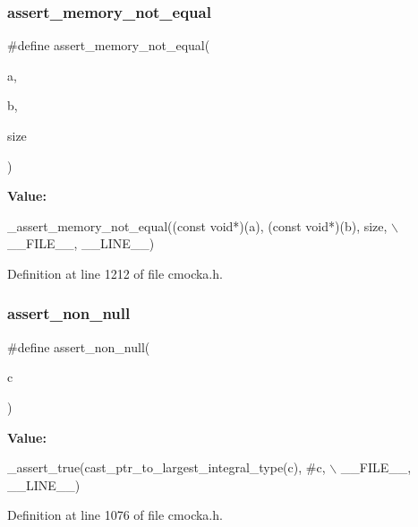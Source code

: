 \subsubsection{\texorpdfstring{assert\+\_\+memory\+\_\+not\+\_\+equal}{assert\_memory\_not\_equal}}
{\footnotesize\ttfamily \#define assert\+\_\+memory\+\_\+not\+\_\+equal(\begin{DoxyParamCaption}\item[{}]{a,  }\item[{}]{b,  }\item[{}]{size }\end{DoxyParamCaption})}

{\bfseries Value\+:}
\begin{DoxyCode}
\_assert\_memory\_not\_equal((\textcolor{keyword}{const} \textcolor{keywordtype}{void}*)(a), (\textcolor{keyword}{const} \textcolor{keywordtype}{void}*)(b), size, \(\backslash\)
                             \_\_FILE\_\_, \_\_LINE\_\_)
\end{DoxyCode}


Definition at line 1212 of file cmocka.\+h.

\mbox{\label{group__cmocka__asserts_gae44d62210cb89257269021c435b55ea5}} 
\subsubsection{\texorpdfstring{assert\+\_\+non\+\_\+null}{assert\_non\_null}}
{\footnotesize\ttfamily \#define assert\+\_\+non\+\_\+null(\begin{DoxyParamCaption}\item[{}]{c }\end{DoxyParamCaption})}

{\bfseries Value\+:}
\begin{DoxyCode}
\_assert\_true(cast\_ptr\_to\_largest\_integral\_type(c), #c, \(\backslash\)
                                        \_\_FILE\_\_, \_\_LINE\_\_)
\end{DoxyCode}


Definition at line 1076 of file cmocka.\+h.

\mbox{\label{group__cmocka__asserts_ga004ef170c4e0b8182a74435bbb16db2c}} 
